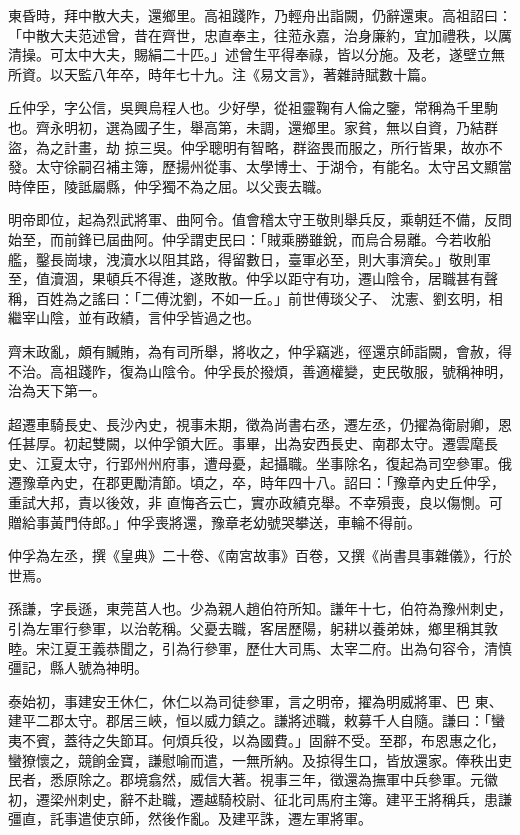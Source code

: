 \begin{pinyinscope}
 東昏時，拜中散大夫，還鄉里。高祖踐阼，乃輕舟出詣闕，仍辭還東。高祖詔曰：「中散大夫范述曾，昔在齊世，忠直奉主，往蒞永嘉，治身廉約，宜加禮秩，以厲清操。可太中大夫，賜絹二十匹。」述曾生平得奉祿，皆以分施。及老，遂壁立無所資。以天監八年卒，時年七十九。注《易文言》，著雜詩賦數十篇。



 丘仲孚，字公信，吳興烏程人也。少好學，從祖靈鞠有人倫之鑒，常稱為千里駒也。齊永明初，選為國子生，舉高第，未調，還鄉里。家貧，無以自資，乃結群盜，為之計畫，劫
 掠三吳。仲孚聰明有智略，群盜畏而服之，所行皆果，故亦不發。太守徐嗣召補主簿，歷揚州從事、太學博士、于湖令，有能名。太守呂文顯當時倖臣，陵詆屬縣，仲孚獨不為之屈。以父喪去職。



 明帝即位，起為烈武將軍、曲阿令。值會稽太守王敬則舉兵反，乘朝廷不備，反問始至，而前鋒已屆曲阿。仲孚謂吏民曰：「賊乘勝雖銳，而烏合易離。今若收船艦，鑿長崗埭，洩瀆水以阻其路，得留數日，臺軍必至，則大事濟矣。」敬則軍至，值瀆涸，果頓兵不得進，遂敗散。仲孚以距守有功，遷山陰令，居職甚有聲稱，百姓為之謠曰：「二傅沈劉，不如一丘。」前世傅琰父子、
 沈憲、劉玄明，相繼宰山陰，並有政績，言仲孚皆過之也。



 齊末政亂，頗有贓賄，為有司所舉，將收之，仲孚竊逃，徑還京師詣闕，會赦，得不治。高祖踐阼，復為山陰令。仲孚長於撥煩，善適權變，吏民敬服，號稱神明，治為天下第一。



 超遷車騎長史、長沙內史，視事未期，徵為尚書右丞，遷左丞，仍擢為衛尉卿，恩任甚厚。初起雙闕，以仲孚領大匠。事畢，出為安西長史、南郡太守。遷雲麾長史、江夏太守，行郢州州府事，遭母憂，起攝職。坐事除名，復起為司空參軍。俄遷豫章內史，在郡更勵清節。頃之，卒，時年四十八。詔曰：「豫章內史丘仲孚，重試大邦，責以後效，非
 直悔吝云亡，實亦政績克舉。不幸殞喪，良以傷惻。可贈給事黃門侍郎。」仲孚喪將還，豫章老幼號哭攀送，車輪不得前。



 仲孚為左丞，撰《皇典》二十卷、《南宮故事》百卷，又撰《尚書具事雜儀》，行於世焉。



 孫謙，字長遜，東莞莒人也。少為親人趙伯符所知。謙年十七，伯符為豫州刺史，引為左軍行參軍，以治乾稱。父憂去職，客居歷陽，躬耕以養弟妹，鄉里稱其敦睦。宋江夏王義恭聞之，引為行參軍，歷仕大司馬、太宰二府。出為句容令，清慎彊記，縣人號為神明。



 泰始初，事建安王休仁，休仁以為司徒參軍，言之明帝，擢為明威將軍、巴
 東、建平二郡太守。郡居三峽，恒以威力鎮之。謙將述職，敕募千人自隨。謙曰：「蠻夷不賓，蓋待之失節耳。何煩兵役，以為國費。」固辭不受。至郡，布恩惠之化，蠻獠懷之，競餉金寶，謙慰喻而遣，一無所納。及掠得生口，皆放還家。俸秩出吏民者，悉原除之。郡境翕然，威信大著。視事三年，徵還為撫軍中兵參軍。元徽初，遷梁州刺史，辭不赴職，遷越騎校尉、征北司馬府主簿。建平王將稱兵，患謙彊直，託事遣使京師，然後作亂。及建平誅，遷左軍將軍。




\end{pinyinscope}
